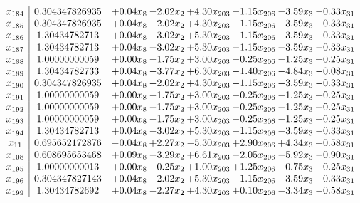 \documentclass[8pt]{article}
\begin{document}
\[\begin{array}{c| c c@{\hskip 2pt} c@{\hskip 2pt} c@{\hskip 2pt} c@{\hskip 2pt} c@{\hskip 2pt} c@{\hskip 2pt} }
 x_{184}   &  0.304347826935 & +  0.04 x_{8} & -2.02 x_{2} & +  4.30 x_{203} & -1.15 x_{206} & -3.59 x_{3} & -0.33 x_{31}\\
 x_{185}   &  0.304347826935 & +  0.04 x_{8} & -2.02 x_{2} & +  4.30 x_{203} & -1.15 x_{206} & -3.59 x_{3} & -0.33 x_{31}\\
 x_{186}   &  1.30434782713 & +  0.04 x_{8} & -3.02 x_{2} & +  5.30 x_{203} & -1.15 x_{206} & -3.59 x_{3} & -0.33 x_{31}\\
 x_{187}   &  1.30434782713 & +  0.04 x_{8} & -3.02 x_{2} & +  5.30 x_{203} & -1.15 x_{206} & -3.59 x_{3} & -0.33 x_{31}\\
 x_{188}   &  1.00000000059 & +  0.00 x_{8} & -1.75 x_{2} & +  3.00 x_{203} & -0.25 x_{206} & -1.25 x_{3} & +  0.25 x_{31}\\
 x_{189}   &  1.30434782733 & +  0.04 x_{8} & -3.77 x_{2} & +  6.30 x_{203} & -1.40 x_{206} & -4.84 x_{3} & -0.08 x_{31}\\
 x_{190}   &  0.304347826935 & +  0.04 x_{8} & -2.02 x_{2} & +  4.30 x_{203} & -1.15 x_{206} & -3.59 x_{3} & -0.33 x_{31}\\
 x_{191}   &  1.00000000059 & +  0.00 x_{8} & -1.75 x_{2} & +  3.00 x_{203} & -0.25 x_{206} & -1.25 x_{3} & +  0.25 x_{31}\\
 x_{192}   &  1.00000000059 & +  0.00 x_{8} & -1.75 x_{2} & +  3.00 x_{203} & -0.25 x_{206} & -1.25 x_{3} & +  0.25 x_{31}\\
 x_{193}   &  1.00000000059 & +  0.00 x_{8} & -1.75 x_{2} & +  3.00 x_{203} & -0.25 x_{206} & -1.25 x_{3} & +  0.25 x_{31}\\
 x_{194}   &  1.30434782713 & +  0.04 x_{8} & -3.02 x_{2} & +  5.30 x_{203} & -1.15 x_{206} & -3.59 x_{3} & -0.33 x_{31}\\
 x_{11}   &  0.695652172876 & -0.04 x_{8} & +  2.27 x_{2} & -5.30 x_{203} & +  2.90 x_{206} & +  4.34 x_{3} & +  0.58 x_{31}\\
 x_{108}   &  0.608695653468 & +  0.09 x_{8} & -3.29 x_{2} & +  6.61 x_{203} & -2.05 x_{206} & -5.92 x_{3} & -0.90 x_{31}\\
 x_{195}   &  1.00000000013 & +  0.00 x_{8} & -0.25 x_{2} & +  1.00 x_{203} & +  1.25 x_{206} & -0.75 x_{3} & -0.25 x_{31}\\
 x_{196}   &  0.304347827143 & +  0.04 x_{8} & -2.02 x_{2} & +  5.30 x_{203} & -1.15 x_{206} & -3.59 x_{3} & -0.33 x_{31}\\
 x_{199}   &  1.30434782692 & +  0.04 x_{8} & -2.27 x_{2} & +  4.30 x_{203} & +  0.10 x_{206} & -3.34 x_{3} & -0.58 x_{31}\\

\end{array}\]
\end{document}
